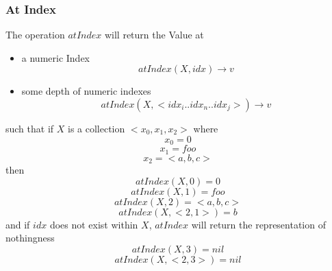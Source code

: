 \documentclass[../main.tex]{subfiles}
\begin{document}
\subsubsection{At Index}
The operation $atIndex$ will return the Value at
\begin{itemize}
\item a numeric Index
  $$atIndex(X, idx) \to v$$
\item some depth of numeric indexes
  $$atIndex(X, <idx_{i}..idx_{n}..idx_{j}>) \to v$$
\end{itemize}
such that if $X$ is a collection $<x_{0}, x_{1}, x_{2}>$
where
$$x_{0} = 0$$
$$x_{1} = foo$$
$$x_{2} = <a, b, c>$$
then
$$atIndex(X, 0) = 0$$
$$atIndex(X, 1) = foo$$
$$atIndex(X, 2) = <a, b, c>$$
$$atIndex(X, <2, 1>) = b$$
and if $idx$ does not exist within $X$, $atIndex$ will return the representation of nothingness
$$atIndex(X, 3) = nil$$
$$atIndex(X, <2, 3>) = nil$$
\end{document}
